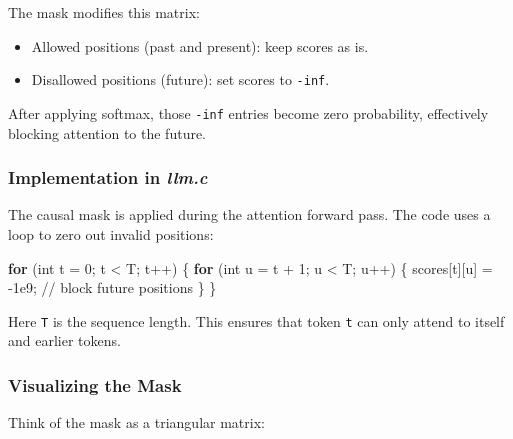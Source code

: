 \documentclass[
  letterpaper,
  DIV=11,
  numbers=noendperiod]{scrreprt}
\newenvironment{Shaded}{\begin{snugshade}}{\end{snugshade}}
\newcommand{\CommentTok}[1]{\textcolor[rgb]{0.37,0.37,0.37}{#1}}
\newcommand{\ControlFlowTok}[1]{\textcolor[rgb]{0.00,0.23,0.31}{\textbf{#1}}}
\newcommand{\DataTypeTok}[1]{\textcolor[rgb]{0.68,0.00,0.00}{#1}}
\newcommand{\DecValTok}[1]{\textcolor[rgb]{0.68,0.00,0.00}{#1}}
\newcommand{\FloatTok}[1]{\textcolor[rgb]{0.68,0.00,0.00}{#1}}
\newcommand{\NormalTok}[1]{\textcolor[rgb]{0.00,0.23,0.31}{#1}}
\newcommand{\OperatorTok}[1]{\textcolor[rgb]{0.37,0.37,0.37}{#1}}
\providecommand{\tightlist}{%
  \setlength{\itemsep}{0pt}\setlength{\parskip}{0pt}}
\begin{document}
The mask modifies this matrix:

\begin{itemize}
\tightlist
\item
  Allowed positions (past and present): keep scores as is.
\item
  Disallowed positions (future): set scores to \texttt{-inf}.
\end{itemize}

After applying softmax, those \texttt{-inf} entries become zero
probability, effectively blocking attention to the future.

\subsubsection{\texorpdfstring{Implementation in
\emph{llm.c}}{Implementation in llm.c}}\label{implementation-in-llm.c-4}

The causal mask is applied during the attention forward pass. The code
uses a loop to zero out invalid positions:

\begin{Shaded}
\begin{Highlighting}[]
\ControlFlowTok{for} \OperatorTok{(}\DataTypeTok{int}\NormalTok{ t }\OperatorTok{=} \DecValTok{0}\OperatorTok{;}\NormalTok{ t }\OperatorTok{\textless{}}\NormalTok{ T}\OperatorTok{;}\NormalTok{ t}\OperatorTok{++)} \OperatorTok{\{}
    \ControlFlowTok{for} \OperatorTok{(}\DataTypeTok{int}\NormalTok{ u }\OperatorTok{=}\NormalTok{ t }\OperatorTok{+} \DecValTok{1}\OperatorTok{;}\NormalTok{ u }\OperatorTok{\textless{}}\NormalTok{ T}\OperatorTok{;}\NormalTok{ u}\OperatorTok{++)} \OperatorTok{\{}
\NormalTok{        scores}\OperatorTok{[}\NormalTok{t}\OperatorTok{][}\NormalTok{u}\OperatorTok{]} \OperatorTok{=} \OperatorTok{{-}}\FloatTok{1e9}\OperatorTok{;} \CommentTok{// block future positions}
    \OperatorTok{\}}
\OperatorTok{\}}
\end{Highlighting}
\end{Shaded}

Here \texttt{T} is the sequence length. This ensures that token
\texttt{t} can only attend to itself and earlier tokens.

\subsubsection{Visualizing the Mask}\label{visualizing-the-mask}

Think of the mask as a triangular matrix:
\end{document}
